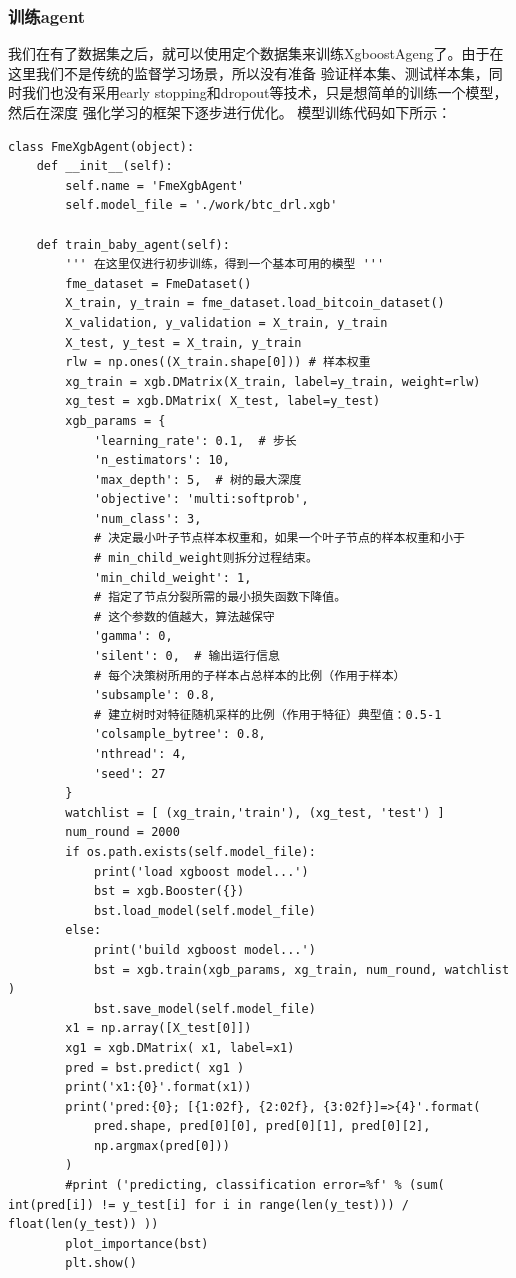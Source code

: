\documentclass{article}
\begin{document}
\subsubsection{训练agent}
我们在有了数据集之后，就可以使用定个数据集来训练XgboostAgeng了。由于在这里我们不是传统的监督学习场景，所以没有准备
验证样本集、测试样本集，同时我们也没有采用early stopping和dropout等技术，只是想简单的训练一个模型，然后在深度
强化学习的框架下逐步进行优化。\newline
模型训练代码如下所示：
\begin{lstlisting}
class FmeXgbAgent(object):
    def __init__(self):
        self.name = 'FmeXgbAgent'
        self.model_file = './work/btc_drl.xgb'

    def train_baby_agent(self):
        ''' 在这里仅进行初步训练，得到一个基本可用的模型 '''
        fme_dataset = FmeDataset()
        X_train, y_train = fme_dataset.load_bitcoin_dataset()
        X_validation, y_validation = X_train, y_train
        X_test, y_test = X_train, y_train
        rlw = np.ones((X_train.shape[0])) # 样本权重
        xg_train = xgb.DMatrix(X_train, label=y_train, weight=rlw)
        xg_test = xgb.DMatrix( X_test, label=y_test)
        xgb_params = {
            'learning_rate': 0.1,  # 步长
            'n_estimators': 10,
            'max_depth': 5,  # 树的最大深度
            'objective': 'multi:softprob',
            'num_class': 3,
            # 决定最小叶子节点样本权重和，如果一个叶子节点的样本权重和小于
            # min_child_weight则拆分过程结束。
            'min_child_weight': 1, 
            # 指定了节点分裂所需的最小损失函数下降值。
            # 这个参数的值越大，算法越保守 
            'gamma': 0,  
            'silent': 0,  # 输出运行信息
            # 每个决策树所用的子样本占总样本的比例（作用于样本）
            'subsample': 0.8,  
            # 建立树时对特征随机采样的比例（作用于特征）典型值：0.5-1
            'colsample_bytree': 0.8,  
            'nthread': 4,
            'seed': 27
        }
        watchlist = [ (xg_train,'train'), (xg_test, 'test') ]
        num_round = 2000
        if os.path.exists(self.model_file):
            print('load xgboost model...')
            bst = xgb.Booster({})
            bst.load_model(self.model_file)
        else:
            print('build xgboost model...')
            bst = xgb.train(xgb_params, xg_train, num_round, watchlist )
            bst.save_model(self.model_file)
        x1 = np.array([X_test[0]])
        xg1 = xgb.DMatrix( x1, label=x1)
        pred = bst.predict( xg1 )
        print('x1:{0}'.format(x1))
        print('pred:{0}; [{1:02f}, {2:02f}, {3:02f}]=>{4}'.format(
            pred.shape, pred[0][0], pred[0][1], pred[0][2],
            np.argmax(pred[0]))
        )
        #print ('predicting, classification error=%f' % (sum( int(pred[i]) != y_test[i] for i in range(len(y_test))) / float(len(y_test)) ))
        plot_importance(bst)
        plt.show()
\end{lstlisting}
\end{document}
